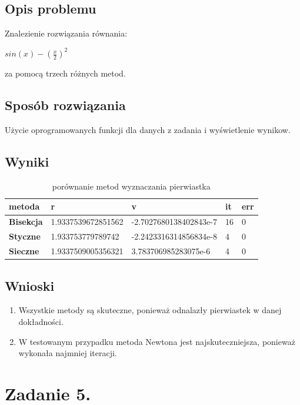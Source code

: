 \documentclass[12pt]{article}
\begin{document}
\subsection{Opis problemu}
Znalezienie rozwiązania równania:
\begin{center}
    $sin(x) - (\frac{x}{2})^2$
\end{center}
za pomocą trzech różnych metod.
\subsection{Sposób rozwiązania}
Użycie oprogramowanych funkcji dla danych z zadania i wyświetlenie wynikow.
\newpage
\subsection{Wyniki}
\begin{table}[h]
    \caption{porównanie metod wyznaczania pierwiastka}
    \label{epsilblankon}
    \begin{tabular}{|l|l|l|l|l|}
        \hline 
        \textbf{metoda} & \textbf{r} & \textbf{v } & \textbf{it } & \textbf{err}\\
        \hline
        \textbf{Bisekcja} & 1.9337539672851562 & -2.7027680138402843e-7 & 16 & 0\\
        \hline
        \textbf{Styczne} & 1.933753779789742 & -2.2423316314856834e-8 & 4 & 0\\
        \hline
        \textbf{Sieczne} & 1.9337509005356321 & 3.783706985283075e-6 & 4 & 0\\
        \hline
    \end{tabular} 
\end{table}

\subsection{Wnioski}
\begin{enumerate}
    \item Wszystkie metody są skuteczne, ponieważ odnalazły pierwiastek w danej dokładności.
    \item W testowanym przypadku metoda Newtona jest najskuteczniejsza, ponieważ wykonała najmniej iteracji.
\end{enumerate}

\section{Zadanie 5.}
\end{document}
